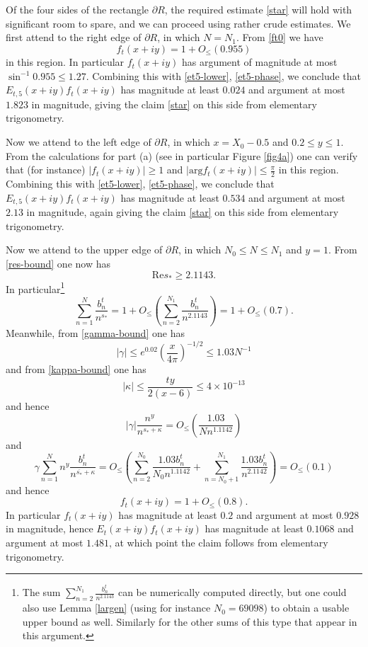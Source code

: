 \documentclass[a4paper,11pt,twoside]{amsart}
\begin{document}
Of the four sides of the rectangle $\partial R$, the required estimate \eqref{star} will hold with significant room to spare, and we can proceed using rather crude estimates.  We first attend to the right edge of $\partial R$, in which $N = N_1$.  
From \eqref{ft0} we have
$$
f_t(x+iy) = 1 + O_{\leq}( 0.955 )$$
in this region.  In particular $f_t(x+iy)$ has argument of magnitude at most $\sin^{-1} 0.955 \leq 1.27$.  Combining this with \eqref{et5-lower}, \eqref{et5-phase}, we conclude that $E_{t,5}(x+iy) f_t(x+iy)$ has magnitude at least $0.024$ and argument at most $1.823$ in magnitude, giving the claim \eqref{star} on this side from elementary trigonometry.

Now we attend to the left edge of $\partial R$, in which $x = X_0 - 0.5$ and $0.2 \leq y \leq 1$.  From the calculations for part (a) (see in particular Figure \ref{fig4a}) one can verify that (for instance) $|f_t(x+iy)| \geq 1$ and $|\mathrm{arg} f_t(x+iy)| \leq \frac{\pi}{2}$ in this region.  Combining this with \eqref{et5-lower}, \eqref{et5-phase}, we conclude that $E_{t,5}(x+iy) f_t(x+iy)$ has magnitude at least $0.534$ and argument at most $2.13$ in magnitude, again giving the claim \eqref{star} on this side from elementary trigonometry.

Now we attend to the upper edge of $\partial R$, in which $N_0 \leq N \leq N_1$ and $y=1$.  From \eqref{res-bound} one now has
$$ \mathrm{Re} s_* \geq 2.1143.$$
In particular\footnote{The sum $\sum_{n=2}^{N_1} \frac{b_n^t}{n^{2.1143}}$ can be numerically computed directly, but one could also use Lemma \ref{largen} (using for instance $N_0 = 69098$) to obtain a usable upper bound as well.  Similarly for the other sums of this type that appear in this argument.}
$$ \sum_{n=1}^N \frac{b_n^t}{n^{s_*}} = 1 + O_{\leq}\left( \sum_{n=2}^{N_1} \frac{b_n^t}{n^{2.1143}} \right) = 1 + O_{\leq}( 0.7 ).$$
Meanwhile, from \eqref{gamma-bound} one has
$$ |\gamma| \leq e^{0.02} \left( \frac{x}{4\pi} \right)^{-1/2} \leq 1.03 N^{-1}$$
and from \eqref{kappa-bound} one has
$$ |\kappa| \leq \frac{ty}{2(x-6)} \leq 4 \times 10^{-13}$$
and hence
$$ |\gamma| \frac{n^y}{n^{s_* + \kappa}} = O_{\leq}( \frac{1.03}{N n^{1.1142}} )$$
and
$$   \gamma \sum_{n=1}^N n^y \frac{b_n^t}{n^{\overline{s_*} + \kappa}} = O_{\leq}\left( \sum_{n=2}^{N_0} \frac{1.03 b_n^t}{N_0 n^{1.1142}} + \sum_{n=N_0+1}^{N_1} \frac{1.03 b_n^t}{n^{2.1142}} \right) = O_{\leq}( 0.1 )$$
and hence
$$ f_t(x+iy) = 1 + O_{\leq}(0.8).$$
In particular $f_t(x+iy)$ has magnitude at least $0.2$ and argument at most $0.928$ in magnitude, hence $E_t(x+iy) f_t(x+iy)$ has magnitude at least $0.1068$ and argument at most $1.481$, at which point the claim follows from elementary trigonometry.
\end{document}
